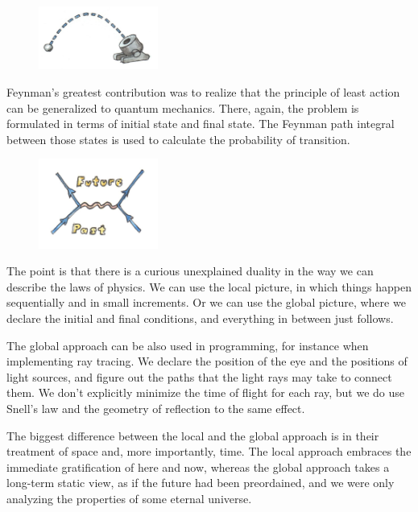 \begin{figure}[H]
\centering
\includegraphics[width=0.35\textwidth]{images/mortar.jpg}
\end{figure}

\noindent
Feynman's greatest contribution was to realize that the principle of
least action can be generalized to quantum mechanics. There, again, the
problem is formulated in terms of initial state and final state. The
Feynman path integral between those states is used to calculate the
probability of transition.

\begin{figure}[H]
\centering
\includegraphics[width=0.35\textwidth]{images/feynman.jpg}
\end{figure}

\noindent
The point is that there is a curious unexplained duality in the way we
can describe the laws of physics. We can use the local picture, in which
things happen sequentially and in small increments. Or we can use the
global picture, where we declare the initial and final conditions, and
everything in between just follows.

The global approach can be also used in programming, for instance when
implementing ray tracing. We declare the position of the eye and the
positions of light sources, and figure out the paths that the light rays
may take to connect them. We don't explicitly minimize the time of
flight for each ray, but we do use Snell's law and the geometry of
reflection to the same effect.

The biggest difference between the local and the global approach is in
their treatment of space and, more importantly, time. The local approach
embraces the immediate gratification of here and now, whereas the global
approach takes a long-term static view, as if the future had been
preordained, and we were only analyzing the properties of some eternal
universe.

